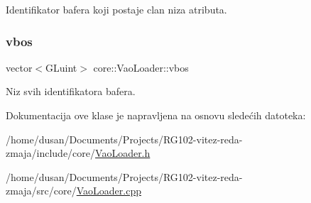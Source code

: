 Identifikator bafera koji postaje clan niza atributa. 

\mbox{\label{classcore_1_1VaoLoader_a8866245dbda8794e13956115557159a2}} 
\subsubsection{\texorpdfstring{vbos}{vbos}}
{\footnotesize\ttfamily vector$<$G\+Luint$>$ core\+::\+Vao\+Loader\+::vbos\hspace{0.3cm}{\ttfamily [private]}}



Niz svih identifikatora bafera. 



Dokumentacija ove klase je napravljena na osnovu sledećih datoteka\+:\begin{DoxyCompactItemize}
\item 
/home/dusan/\+Documents/\+Projects/\+R\+G102-\/vitez-\/reda-\/zmaja/include/core/\hyperlink{VaoLoader_8h}{Vao\+Loader.\+h}\item 
/home/dusan/\+Documents/\+Projects/\+R\+G102-\/vitez-\/reda-\/zmaja/src/core/\hyperlink{VaoLoader_8cpp}{Vao\+Loader.\+cpp}\end{DoxyCompactItemize}
